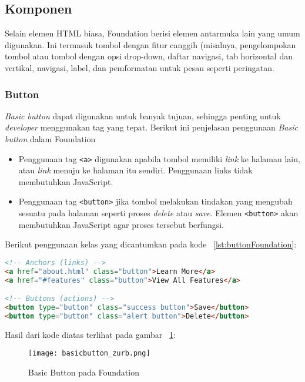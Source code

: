 \subsection{Komponen}
Selain elemen HTML biasa, Foundation berisi elemen antarmuka lain yang umum digunakan. Ini termasuk tombol dengan fitur canggih (misalnya, pengelompokan tombol atau tombol dengan opsi drop-down, daftar navigasi, tab horizontal dan vertikal, navigasi, label, dan pemformatan untuk pesan seperti peringatan.

\subsubsection{Button}
\textit{Basic button} dapat digunakan untuk banyak tujuan, sehingga penting untuk \textit{developer} menggunakan tag yang tepat. Berikut ini penjelasan penggunaan \textit{Basic button} dalam Foundation
\begin{itemize}
	\item Penggunaan tag \texttt{<a>} digunakan apabila tombol memiliki \textit{link} ke halaman lain, atau \textit{link} menuju ke halaman itu sendiri. Penggunaan links tidak membutuhkan JavaScript.
	\item Penggunaan tag \texttt{<button>} jika tombol melakukan tindakan yang mengubah sesuatu pada halaman seperti proses \textit{delete} atau \textit{save}. Elemen \texttt{<button>} akan membutuhkan JavaScript agar proses tersebut berfungsi. 
\end{itemize}
Berikut penggunaan kelas yang dicantumkan pada kode ~\ref{lst:buttonFoundation}:
\begin{lstlisting}[style=customhtml, language=HTML,  basicstyle=\ttfamily, frame=single, columns=fullflexible, keepspaces=true, breaklines=true, showstringspaces=false, label={lst:buttonFoundation}, caption=Button pada foundation 6.] 
<!-- Anchors (links) -->
<a href="about.html" class="button">Learn More</a>
<a href="#features" class="button">View All Features</a>

<!-- Buttons (actions) -->
<button type="button" class="success button">Save</button>
<button type="button" class="alert button">Delete</button>
\end{lstlisting}
Hasil dari kode diatas terlihat pada gambar ~\ref{fig:buttonFoundation}:
\begin{figure} [H]
	\centering  
	\texttt{[image: basicbutton\_zurb.png]}  
	\caption{Basic Button pada Foundation}
	\label{fig:buttonFoundation}
\end{figure}


